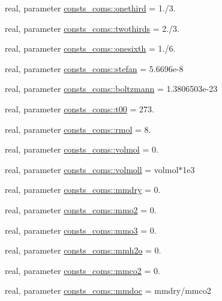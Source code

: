 \begin{DoxyCompactItemize}
\item 
real, parameter \hyperlink{namespaceconsts__coms_a77951232affbc4dc54bd20a0dfe1244f}{consts\+\_\+coms\+::onethird} = 1./3.
\item 
real, parameter \hyperlink{namespaceconsts__coms_a7ac856e6d8ab0454fcd39dce6cd2ea71}{consts\+\_\+coms\+::twothirds} = 2./3.
\item 
real, parameter \hyperlink{namespaceconsts__coms_ada6e5b6811f533bff45549fe556966ee}{consts\+\_\+coms\+::onesixth} = 1./6.
\item 
real, parameter \hyperlink{namespaceconsts__coms_af216e24a2bb718d85f4e5501f586634e}{consts\+\_\+coms\+::stefan} = 5.\+6696e-\/8
\item 
real, parameter \hyperlink{namespaceconsts__coms_afc5519d22399e9054c914e08f4b03bc5}{consts\+\_\+coms\+::boltzmann} = 1.\+3806503e-\/23
\item 
real, parameter \hyperlink{namespaceconsts__coms_afbc98a1338166b05d3a2d997c7b27259}{consts\+\_\+coms\+::t00} = 273.
\item 
real, parameter \hyperlink{namespaceconsts__coms_ada5d8a1334128cdd95a8a4e15c149599}{consts\+\_\+coms\+::rmol} = 8.
\item 
real, parameter \hyperlink{namespaceconsts__coms_a2c08b6494703da0637aaf244befddfe2}{consts\+\_\+coms\+::volmol} = 0.
\item 
real, parameter \hyperlink{namespaceconsts__coms_a8931f8cd781a8b09d11212c651fec485}{consts\+\_\+coms\+::volmoll} = volmol$\ast$1e3
\item 
real, parameter \hyperlink{namespaceconsts__coms_a7aa35c23be3fddc9db2686245d45cda1}{consts\+\_\+coms\+::mmdry} = 0.
\item 
real, parameter \hyperlink{namespaceconsts__coms_a5f6f1ee45767d7fcd7c397df0631feab}{consts\+\_\+coms\+::mmo2} = 0.
\item 
real, parameter \hyperlink{namespaceconsts__coms_a3d2db28ffe653e18e24973962ee92eb1}{consts\+\_\+coms\+::mmo3} = 0.
\item 
real, parameter \hyperlink{namespaceconsts__coms_a613dd19deda61e084a0a1c445c059339}{consts\+\_\+coms\+::mmh2o} = 0.
\item 
real, parameter \hyperlink{namespaceconsts__coms_ac39e12891c7cedb24326a132e7288337}{consts\+\_\+coms\+::mmco2} = 0.
\item 
real, parameter \hyperlink{namespaceconsts__coms_a59bb453864e15b4a294a2569058fca9d}{consts\+\_\+coms\+::mmdoc} = mmdry/mmco2
\item 

\end{DoxyCompactItemize}
